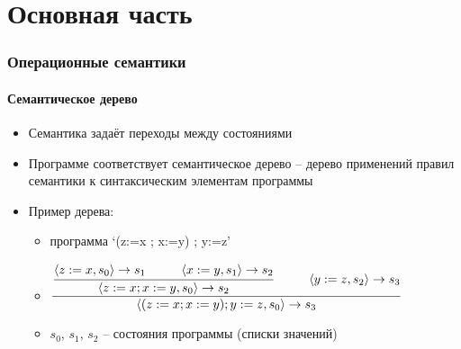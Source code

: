 \documentclass[10pt,pdf,hyperref={unicode}]{beamer}
\begin{document}
      \section{Основная часть}

      \newcommand{\control}[2]{\langle #1, #2 \rangle}
      \newcommand{\rulens}[3]{\control{#1}{#2} \to #3}
      \newcommand{\ruless}[4]{\rulens{#1}{#2}{#3} \frac{#4}{}}
      \newcommand{\tree}[3]{\cfrac{#1 \hspace{10mm} #2}{#3}}

      \begin{frame}
         \frametitle{Операционные семантики}
         \framesubtitle{Семантическое дерево}
         \begin{itemize}
            \item Семантика задаёт переходы между состояниями
            \item Программе соответствует семантическое дерево --
             дерево применений правил семантики к синтаксическим
             элементам программы
             \item Пример дерева:
             \begin{itemize}
                \item[] программа `(z:=x ; x:=y) ; y:=z'
                \newline
                \item[] $\tree{\tree{\rulens{z:=x}{s_0}{s_1}}
                                    {\rulens{x:=y}{s_1}{s_2}}
                                    {\rulens{z:=x;x:=y}{s_0}{s_2}}}
                              {\rulens{y:= z}{s_2}{s_3}}
                              {\rulens{(z:=x ; x:=y) ; y:=z}{s_0}{s_3}}$
                \newline
                \item[] $s_0$, $s_1$, $s_2$ -- состояния программы (списки значений)
             \end{itemize}
         \end{itemize}
      \end{frame}


      \newcommand{\seqns}[0]{\tree{\rulens{p_1}{s_0}{s_1}}{\rulens{p_2}{s_1}{s_2}}{\rulens{p_1 ; p_2}{s_0}{s_2}}}
      \newcommand{\iftruens}[0]{s_0[b] = true\Rightarrow\tree{\rulens{p_1}{s_0}{s_1}}{}
                                                             {\rulens{\mbox{if b then $p_1$ else $p_2$}}{s_0}{s_1}}}
      \newcommand{\assignns}[0]{\rulens{x:=a}{s}{s[x \mapsto a]}}
\end{document}
